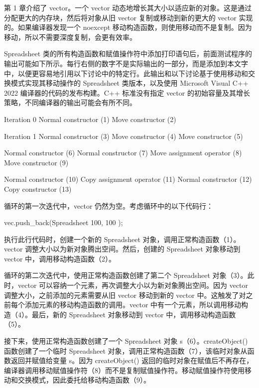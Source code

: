 第 1 章介绍了 vector。一个 vector 动态地增长其大小以适应新的对象。这是通过分配更大的内存块，然后将对象从旧 vector 复制或移动到新的更大的 vector 实现的。如果编译器发现一个 noexcept 移动构造函数，则使用移动而不是复制。因为移动，所以不需要深度复制，会更有效率。

Spreadsheet 类的所有构造函数和赋值操作符中添加打印语句后，前面测试程序的输出可能如下所示。每行右侧的数字不是实际输出的一部分，而是添加到本文字中，以便更容易地引用以下讨论中的特定行。此输出和以下讨论基于使用移动和交换模式实现其移动操作的 Spreadsheet 类版本，以及使用 Microsoft Visual C++ 2022 编译器的代码的发布构建。C++ 标准没有指定 vector 的初始容量及其增长策略，不同编译器的输出可能会有所不同。

\begin{shell}
Iteration 0
Normal constructor          (1)
Move constructor            (2)

Iteration 1
Normal constructor          (3)
Move constructor            (4)
Move constructor            (5)

Normal constructor          (6)
Normal constructor          (7)
Move assignment operator    (8)
Move constructor            (9)

Normal constructor         (10)
Copy assignment operator   (11)
Normal constructor         (12)
Copy constructor           (13)
\end{shell}

循环的第一次迭代中，vector 仍然为空。考虑循环中的以下代码行：

\begin{cpp}
vec.push_back(Spreadsheet { 100, 100 });
\end{cpp}

执行此行代码时，创建一个新的 Spreadsheet 对象，调用正常构造函数（1）。vector 调整大小以为新对象腾出空间。然后，创建的 Spreadsheet 对象移动到 vector 中，调用移动构造函数（2）。

循环的第二次迭代中，使用正常构造函数创建了第二个 Spreadsheet 对象（3）。此时，vector 可以容纳一个元素，再次调整大小以为新对象腾出空间。因为 vector 调整大小，之前添加的元素需要从旧 vector 移动到新的 vector 中。这触发了对之前每个添加元素的移动构造函数的调用。vector 中有一个元素，所以调用移动构造（4）。最后，新的 Spreadsheet 对象移动到 vector 中，调用移动构造函数（5）。

接下来，使用正常构造函数创建了一个 Spreadsheet 对象 s（6）。createObject() 函数创建了一个临时 Spreadsheet 对象，调用正常构造函数（7），该临时对象从函数返回并赋值给变量 s。因为 createObject() 返回的临时对象在赋值后不再存在，编译器调用移动赋值操作符（8）而不是复制赋值操作符。移动赋值操作符使用移动和交换模式，因此委托给移动构造函数（9）。

